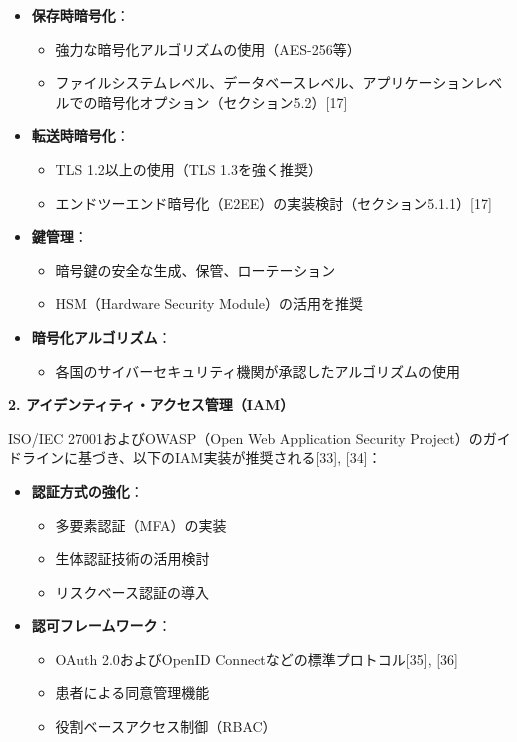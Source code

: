 \documentclass[
  a4paper,
  a4paper,
  11pt]{ltjsbook}
\providecommand{\tightlist}{%
  \setlength{\itemsep}{0pt}\setlength{\parskip}{0pt}}
\begin{document}
\begin{itemize}
\tightlist
\item
  \textbf{保存時暗号化}：

  \begin{itemize}
  \tightlist
  \item
    強力な暗号化アルゴリズムの使用（AES-256等）
  \item
    ファイルシステムレベル、データベースレベル、アプリケーションレベルでの暗号化オプション（セクション5.2）{[}17{]}
  \end{itemize}
\item
  \textbf{転送時暗号化}：

  \begin{itemize}
  \tightlist
  \item
    TLS 1.2以上の使用（TLS 1.3を強く推奨）
  \item
    エンドツーエンド暗号化（E2EE）の実装検討（セクション5.1.1）{[}17{]}
  \end{itemize}
\item
  \textbf{鍵管理}：

  \begin{itemize}
  \tightlist
  \item
    暗号鍵の安全な生成、保管、ローテーション
  \item
    HSM（Hardware Security Module）の活用を推奨
  \end{itemize}
\item
  \textbf{暗号化アルゴリズム}：

  \begin{itemize}
  \tightlist
  \item
    各国のサイバーセキュリティ機関が承認したアルゴリズムの使用
  \end{itemize}
\end{itemize}

\textbf{2. アイデンティティ・アクセス管理（IAM）}

ISO/IEC 27001およびOWASP（Open Web Application Security
Project）のガイドラインに基づき、以下のIAM実装が推奨される{[}33{]},
{[}34{]}：

\begin{itemize}
\tightlist
\item
  \textbf{認証方式の強化}：

  \begin{itemize}
  \tightlist
  \item
    多要素認証（MFA）の実装
  \item
    生体認証技術の活用検討
  \item
    リスクベース認証の導入
  \end{itemize}
\item
  \textbf{認可フレームワーク}：

  \begin{itemize}
  \tightlist
  \item
    OAuth 2.0およびOpenID Connectなどの標準プロトコル{[}35{]}, {[}36{]}
  \item
    患者による同意管理機能
  \item
    役割ベースアクセス制御（RBAC）
  \end{itemize}
\end{itemize}
\end{document}
